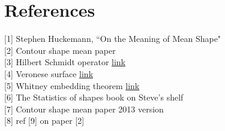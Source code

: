 \documentclass[12pt]{article}
\theoremstyle{definition}
\theoremstyle{remark}
\numberwithin{equation}{section}
\begin{document}
\section{References}
[1] Stephen Huckemann, ``On the Meaning of Mean Shape" \\[0.2cm]
[2] Contour shape mean paper\\[0.2cm]
[3] Hilbert Schmidt operator \href{http://en.wikipedia.org/wiki/Hilbert\%E2\%80\%93Schmidt_operator}{link}\\[0.2cm]
[4] Veronese surface \href{http://en.wikipedia.org/wiki/Veronese_surface}{link}\\[0.2cm]
[5] Whitney embedding theorem \href{http://en.wikipedia.org/wiki/Whitney_embedding_theorem}{link}\\[0.2cm]
[6] The Statistics of shapes book on Steve's shelf\\[0.2cm]
[7] Contour shape mean paper 2013 version \\[0.2cm]
[8] ref [9] on paper [2]
\end{document}
